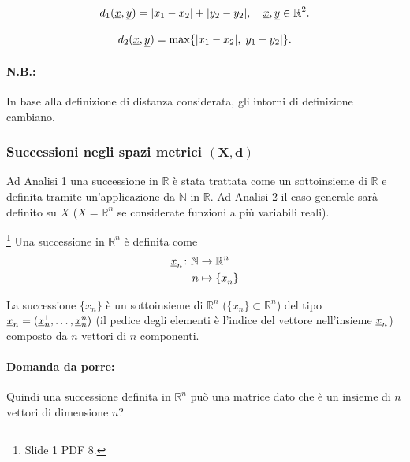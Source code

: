 \begin{definition}
    \begin{equation*}
        d_1(\uline x,\uline y)=|x_1-x_2|+|y_2-y_2|,\quad\uline x,\uline y\in\mathbb R^2.
    \end{equation*}
\end{definition}

\begin{definition}
    \begin{equation*}
        d_2(\uline x,\uline y)=\max\{|x_1-x_2|,|y_1-y_2|\}.
    \end{equation*}
\end{definition}

\paragraph{N.B.:} In base alla definizione di distanza considerata, gli intorni di definizione cambiano.

\subsubsection{Successioni negli spazi metrici \texorpdfstring{$\boldsymbol{(X,d)}$}{(X,d)}}
Ad Analisi 1 una successione in $\mathbb R$ è stata trattata come un sottoinsieme di $\mathbb R$ e definita tramite un'applicazione da $\mathbb N$ in $\mathbb R$. Ad Analisi 2 il caso generale sarà definito su $X$ ($X=\mathbb R^n$ se considerate funzioni a più variabili reali).

\begin{definition}\footnote{Slide 1 PDF 8.}
    Una successione in $\mathbb R^n$ è definita come
    \begin{equation*}
        \begin{aligned}
            \uline x_n\colon\mathbb N&\rightarrow\mathbb R^n\\
            n&\mapsto\{\uline x_n\}
        \end{aligned}
    \end{equation*}
\end{definition}

La successione $\{x_n\}$ è un sottoinsieme di $\mathbb R^n$ ($\{x_n\}\subset \mathbb R^n$) del tipo $\uline x_n=(\uline x_n^1,\hdots,\uline x_n^n)$ (il pedice degli elementi è l'indice del vettore nell'insieme $\uline x_n$) composto da $n$ vettori di $n$ componenti.

\paragraph{Domanda da porre:} Quindi una successione definita in $\mathbb R^n$ può una matrice dato che è un insieme di $n$ vettori di dimensione $n$?

